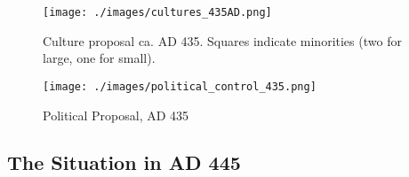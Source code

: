 \documentclass{article}
\begin{document}
	\newpage
	
	\begin{figure}[h!]
		\centering
		\texttt{[image: ./images/cultures\_435AD.png]}
		\caption{Culture proposal ca. AD 435. Squares indicate minorities (two for large, one for small).}
	\end{figure}
	
	\begin{figure}[h!]
		\centering
		\texttt{[image: ./images/political\_control\_435.png]}
		\caption{Political Proposal, AD 435}
	\end{figure}
	
	\newpage
	
	\subsection{The Situation in AD 445}
	\label{sec:timeline:subsec:445}
	
\end{document}
